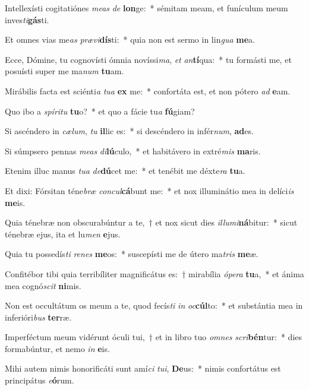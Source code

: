 \item Intellexísti cogitatiónes \textit{me}\textit{as} \textit{de} \textbf{lon}ge:~* sémitam meam, et funículum meum inves\textit{ti}\textbf{gás}ti.
\item Et omnes vias me\textit{as} \textit{præ}\textit{vi}\textbf{dís}ti:~* quia non est sermo in lin\textit{gua} \textbf{me}a.
\item Ecce, Dómine, tu cognovísti ómnia novíssi\textit{ma}, \textit{et} \textit{an}\textbf{tí}qua:~* tu formásti me, et posuísti super me ma\textit{num} \textbf{tu}am.
\item Mirábilis facta est sciénti\textit{a} \textit{tu}\textit{a} \textbf{ex} me:~* confortáta est, et non pótero \textit{ad} \textbf{e}am.
\item Quo ibo a \textit{spí}\textit{ri}\textit{tu} \textbf{tu}o?~* et quo a fácie tu\textit{a} \textbf{fú}giam?
\item Si ascéndero in \textit{cæ}\textit{lum}, \textit{tu} \textbf{il}lic es:~* si descéndero in infér\textit{num}, \textbf{ad}es.
\item Si súmpsero pennas \textit{me}\textit{as} \textit{di}\textbf{lú}culo,~* et habitávero in extré\textit{mis} \textbf{ma}ris.
\item Etenim illuc manus \textit{tu}\textit{a} \textit{de}\textbf{dú}cet me:~* et tenébit me déxte\textit{ra} \textbf{tu}a.
\item Et dixi: Fórsitan téne\textit{bræ} \textit{con}\textit{cul}\textbf{cá}bunt me:~* et nox illuminátio mea in delíci\textit{is} \textbf{me}is.
\item Quia ténebræ non obscurabúntur a te,~† et nox sicut dies \textit{il}\textit{lu}\textit{mi}\textbf{ná}bitur:~* sicut ténebræ ejus, ita et lu\textit{men} \textbf{e}jus.
\item Quia tu possedís\textit{ti} \textit{re}\textit{nes} \textbf{me}os:~* suscepísti me de útero ma\textit{tris} \textbf{me}æ.
\item Confitébor tibi quia terribíliter magnificátus es:~† mirabília \textit{ó}\textit{pe}\textit{ra} \textbf{tu}a,~* et ánima mea cognó\textit{scit} \textbf{ni}mis.
\item Non est occultátum os meum a te, quod fecís\textit{ti} \textit{in} \textit{oc}\textbf{cúl}to:~* et substántia mea in inferióri\textit{bus} \textbf{ter}ræ.
\item Imperféctum meum vidérunt óculi tui,~† et in libro tuo \textit{om}\textit{nes} \textit{scri}\textbf{bén}tur:~* dies formabúntur, et nemo \textit{in} \textbf{e}is.
\item Mihi autem nimis honorificáti sunt amí\textit{ci} \textit{tu}\textit{i}, \textbf{De}us:~* nimis confortátus est principátus \textit{e}\textbf{ó}rum.
